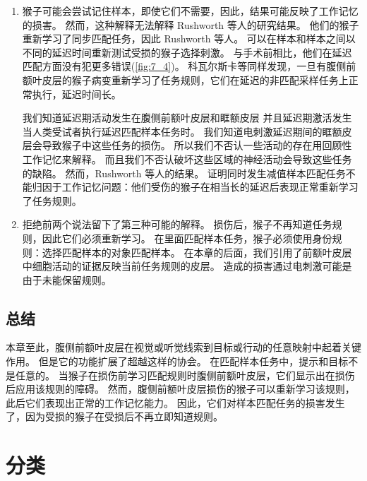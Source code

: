 \begin{enumerate}
\item 猴子可能会尝试记住样本，即使它们不需要，因此，结果可能反映了工作记忆的损害。
然而，这种解释无法解释 Rushworth 等人的研究结果。 
他们的猴子重新学习了同步匹配任务，因此 Rushworth 等人。
可以在样本和样本之间以不同的延迟时间重新测试受损的猴子选择刺激。 
与手术前相比，他们在延迟匹配方面没有犯更多错误(\ref{fig:7_4})。 
科瓦尔斯卡等\cite{kowalska1991role}同样发现，一旦有腹侧前额叶皮层的猴子病变重新学习了任务规则，它们在延迟的非匹配采样任务上正常执行，延迟时间长。
\par


我们知道延迟期活动发生在腹侧前额叶皮层和眶额皮层\cite{rosenkilde1981single,hoshi2000neuronal} 并且延迟期激活发生当人类受试者执行延迟匹配样本任务时\cite{rama2005functional,schon2008delayed}。
我们知道电刺激延迟期间的眶额皮层会导致猴子中这些任务的损伤\cite{sobotka2005can}。
所以我们不否认一些活动的存在用回顾性工作记忆来解释。 
而且我们不否认破坏这些区域的神经活动会导致这些任务的缺陷。 
然而，Rushworth 等人的结果。 
证明同时发生减值样本匹配任务不能归因于工作记忆问题：他们受伤的猴子在相当长的延迟后表现正常重新学习了任务规则。
\item 拒绝前两个说法留下了第三种可能的解释。 
损伤后，猴子不再知道任务规则，因此它们必须重新学习。 
在里面匹配样本任务，猴子必须使用身份规则：选择匹配样本的对象匹配样本。 
在本章的后面，我们引用了前额叶皮层中细胞活动的证据反映当前任务规则的皮层\cite{wallis2001single}。
造成的损害通过电刺激\cite{sobotka2005can}可能是由于未能保留规则。
\end{enumerate}



\subsection{总结}
\par 

本章至此，腹侧前额叶皮层在视觉或听觉线索到目标或行动的任意映射中起着关键作用。 
但是它的功能扩展了超越这样的协会。 
在匹配样本任务中，提示和目标不是任意的。 
当猴子在损伤前学习匹配规则时腹侧前额叶皮层，它们显示出在损伤后应用该规则的障碍。
然而，腹侧前额叶皮层损伤的猴子可以重新学习该规则，此后它们表现出正常的工作记忆能力。 
因此，它们对样本匹配任务的损害发生了，因为受损的猴子在受损后不再立即知道规则。



\section{分类}
\par

